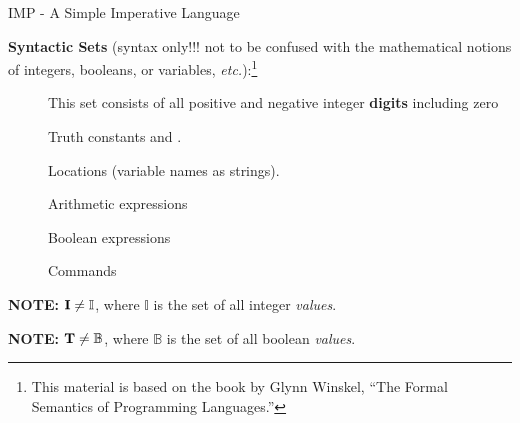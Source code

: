 \documentclass{beamer}
\begin{document}

\begin{frame}{IMP - A Simple Imperative Language}

{\bf Syntactic Sets} (syntax only!!! not to be confused with the mathematical notions of integers, booleans, or variables, {\it etc.}):\footnote{This material is based on the book by Glynn Winskel, ``The Formal Semantics
of Programming Languages.''}
\begin{description}
\item[] This set consists of all positive and negative integer {\bf digits} including zero
\item[] Truth constants  and .
\item[] Locations (variable names as strings).
\item[] Arithmetic expressions
\item[] Boolean expressions
\item[] Commands
\end{description}

{\bf NOTE:} $\mbox{\bf I} \ne \mathbb{I}$, where $\mathbb{I}$ is the set of all integer {\em values}.

{\bf NOTE:} $\mbox{\bf T} \ne \mathbb{B}$, where $\mathbb{B}$ is the set of all boolean {\em values}.

\end{frame}

\end{document}

